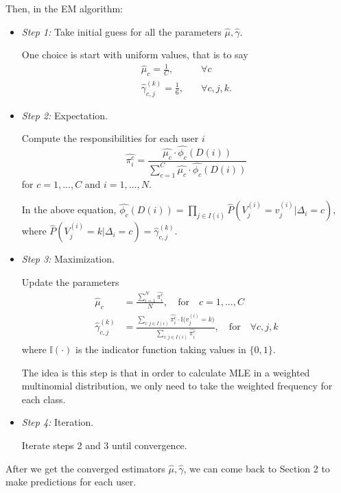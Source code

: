 \documentclass[a4paper,10pt]{article}
\begin{document}
Then, in the EM algorithm: 
\begin{itemize}
\item \emph{Step 1:} Take initial guess for all the parameters $\hat{\mu}, \hat{\gamma}$. 

One choice is start with uniform values, that is to say
\begin{equation}
\begin{split}
\hat{\mu}_c = \frac{1}{C}, \quad &\forall c \\
\hat{\gamma}_{c, j}^{(k)} = \frac{1}{6}, \quad &\forall c, j, k.
\end{split}
\end{equation}

\item \emph{Step 2:} Expectation.

Compute the responsibilities for each user $i$
\begin{equation}
	\hat{\pi_i^c} = \frac{\hat{\mu_c} \cdot \hat{\phi_c}(D(i))}{\sum_{c = 1}^{C}\hat{\mu_c} \cdot \hat{\phi_c}(D(i))}
\end{equation}
for $c = 1, ..., C$ and $ i = 1, ..., N$.

In the above equation, $ \hat{\phi_c}(D(i)) = \prod_{j \in I(i)}\hat{P}(V_j^{(i)} = v_j^{(i)} | \Delta_i = c)$, where $  \hat{P}(V_j^{(i)} = k | \Delta_{i} = c) = \hat{\gamma}_{c, j}^{(k)}$.

\item \emph{Step 3:} Maximization.

Update the parameters
\begin{equation}
\begin{split}
\hat{\mu}_c &= \frac{\sum_{i = 1}^{N}\hat{\pi_i^c}}{N}, \quad \text{for} \quad c = 1, ..., C \\
\hat{\gamma}_{c, j}^{(k)} &= \frac{\sum_{i: j\in I(i)} \hat{\pi_i^c} \cdot \mathbb{I}\big( v_j^{(i)} = k \big)}{\sum_{i: j\in I(i)}\hat{\pi_i^c}}, \quad \text{for} \quad \forall c, j, k
\end{split}
\end{equation}
where $\mathbb{I}(\cdot)$ is the indicator function taking values in $\{0, 1\}$.

The idea is this step is that in order to calculate MLE in a weighted multinomial distribution, we only need to take the weighted frequency for each class.

\item \emph{Step 4:} Iteration.

Iterate steps 2 and 3 until convergence.
\end{itemize}

After we get the converged estimators $\hat{\mu}, \hat{\gamma}$, we can come back to Section 2 to make predictions for each user.















	
\end{document}
